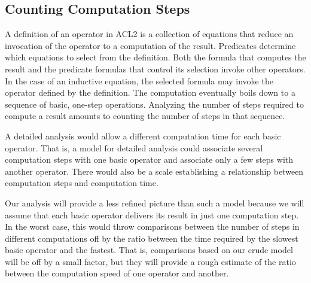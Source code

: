 \subsection{Counting Computation Steps}
\label{subsec:counting-computation-steps}

A definition of an operator in ACL2
is a collection of equations that
reduce an invocation of the operator
to a computation of the result.
Predicates determine
which equations to select from the definition.
Both the formula that computes the result and
the predicate formulas that control
its selection invoke other operators.
In the case of an inductive equation,
the selected formula may invoke the operator
defined by the definition.
The computation eventually boils down to a sequence of basic,
one-step operations.
Analyzing the number of steps required to compute a result
amounts to counting the number of steps in that sequence.

A detailed analysis would allow a different
computation time for each basic operator.
That is, a model for detailed analysis could associate
several computation steps with one basic operator
and associate only a few steps with another operator.
There would also be a scale establishing a relationship between
computation steps and computation time.

Our analysis will provide a less refined picture than such
a model because we will assume that each basic operator
delivers its result in just one computation step.
In the worst case, this would throw comparisons between
the number of steps in different computations off
by the ratio between the time required by the slowest basic
operator and the fastest. That is, comparisons
based on our crude model
will be off by a small factor,
but they will provide a
rough estimate of the ratio between the computation speed of
one operator and another.

